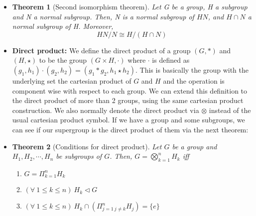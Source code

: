 \documentclass[a4paper]{article}
\newtheorem{theorem}{Theorem}[section]
\begin{document}
\begin{itemize}
This theorem is also known as the first isomorphism theorem. In reality, this theorem comes from a deeper and simpler theorem of sets, the canonical decomposition of functions between sets, which is in essence the same but considering general morphisms of sets instead of morphisms of groups.

\item
\begin{theorem}[Second isomorphism theorem]
Let G be a group, H a subgroup and N a normal subgroup. Then, N is a normal subgroup of $HN$, and $H\cap N$ a normal subgroup of H. Moreover,
\begin{equation}
HN/N \cong H/(H \cap N)
\end{equation}
\end{theorem}

\item
\textbf{Direct product: }We define the direct product of a group $(G,\ast)$ and $(H,\star)$ to be the group $(G \times H,\cdot)$ where $\cdot$ is defined as $(g_{1},h_{1})\cdot(g_{2},h_{2})=(g_{1}\ast g_{2},h_{1} \star h_{2})$. This is basically the group with the underlying set the cartesian product of $G$ and $H$ and the operation is component wise with respect to each group. We can extend this definition to the direct product of more than 2 groups, using the same cartesian product construction. We also normally denote the direct product via $\otimes$ instead of the usual cartesian product symbol. If we have a group and some subgroups, we can see if our supergroup is the direct product of them via the next theorem:

\item
\begin{theorem}[Conditions for direct product]
Let $G$ be a group and $H_{1},H_{2}, \cdots , H_{n}$ be subgroups of $G$. Then, $G=\bigotimes_{k=1}^{n} H_{k}$ iff
\begin{enumerate}
\item
$G=\Pi_{k=1}^{n} H_{k}$
\item
$(\forall\ 1 \leq k \leq n)\ H_{k} \triangleleft G$
\item
$(\forall\ 1 \leq k \leq n)\ H_{k} \cap (\Pi_{j=1\  j\neq k}^{n} H_{j}) = \{e\}$
\end{enumerate}

\end{theorem}


\end{itemize}
\end{document}
